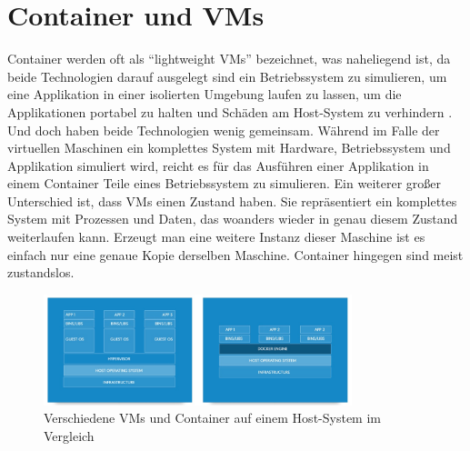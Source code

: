 \chapter{Container und VMs}

Container werden oft als “lightweight VMs” bezeichnet, was naheliegend ist, da beide Technologien darauf ausgelegt sind ein Betriebssystem zu simulieren, um eine Applikation in einer isolierten Umgebung laufen zu lassen, um die Applikationen portabel zu halten und Schäden am Host-System zu verhindern \cite{docker:cvsvm}.
Und doch haben beide Technologien wenig gemeinsam. Während im Falle der virtuellen Maschinen ein komplettes System mit Hardware, Betriebssystem und Applikation simuliert wird, reicht es für das Ausführen einer Applikation in einem Container Teile eines Betriebssystem zu simulieren.
Ein weiterer großer Unterschied ist, dass VMs einen Zustand haben. Sie repräsentiert ein komplettes System mit Prozessen und Daten, das woanders wieder in genau diesem Zustand weiterlaufen kann. Erzeugt man eine weitere Instanz dieser Maschine ist es einfach nur eine genaue Kopie derselben Maschine. Container hingegen sind meist zustandslos.\\

\begin{figure}[!ht]
  \centering
  \includegraphics[width=0.8\textwidth]{images/container-vm.jpg}
  \caption{Verschiedene VMs und Container auf einem Host-System im Vergleich \cite{docker}}
\end{figure}


